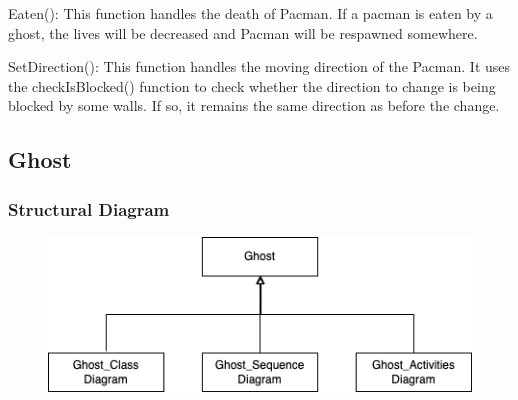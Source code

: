 \documentclass[11pt]{article}
\begin{document}
Eaten(): This function handles the death of Pacman. If a pacman is eaten by a ghost, the lives will be decreased and Pacman will be respawned somewhere.

SetDirection(): This function handles the moving direction of the Pacman. It uses the checkIsBlocked() function to check whether the direction to change is being blocked by some walls. If so, it remains the same direction as before the change.
\subsection{Ghost}
\subsubsection{Structural Diagram}
\begin{figure}[H]
    \centering
    \includegraphics*[scale=0.4]{Ghost_Structural.png}
\end{figure}
\end{document}

